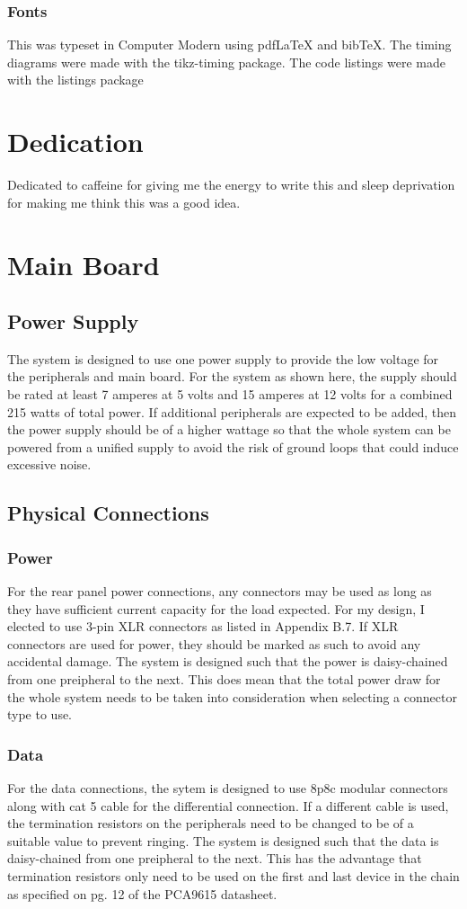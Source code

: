 \documentclass{book}
\begin{document}
\subsection*{Fonts}
This was typeset in Computer Modern using pdf\LaTeX{} and bib\TeX{}.
The timing diagrams were made with the tikz-timing package.
The code listings were made with the listings package
\chapter*{Dedication}
Dedicated to caffeine for giving me the energy to write this and sleep deprivation for making me think this was a good idea.
\tableofcontents
\listoffigures
\listoftables
\mainmatter
\chapter{Main Board}
\section{Power Supply}
The system is designed to use one power supply to provide the low voltage for the peripherals and main board. For the system as shown here, the supply 
should be rated at least 7 amperes at 5 volts and 15 amperes at 12 volts for a combined 215 watts of total power. If additional peripherals are expected to 
be added, then the power supply should be of a higher wattage so that the whole system can be powered from a unified supply to avoid the risk of ground 
loops that could induce excessive noise.

\section{Physical Connections}
\subsection{Power}
For the rear panel power connections, any connectors may be used as long as they have sufficient current capacity for the load expected. For my design, I 
elected to use 3-pin XLR connectors as listed in Appendix B.7. If XLR connectors are used for power, they should be marked as such to avoid any 
accidental damage. The system is designed such that the power is daisy-chained from one preipheral to the next. This does mean that the total power 
draw for the whole system needs to be taken into consideration when selecting a connector type to use.

\subsection{Data}
For the data connections, the sytem is designed to use 8p8c modular connectors along with cat 5 cable for the differential connection. If a different cable is 
used, the termination resistors on the peripherals need to be changed to be of a suitable value to prevent ringing. The system is designed such that the 
data is daisy-chained from one preipheral to the next. This has the advantage that termination resistors only need to be used on the first and last device in 
the chain as specified on pg. 12 of the PCA9615 datasheet\cite{nxp:pca9615}.
\end{document}
